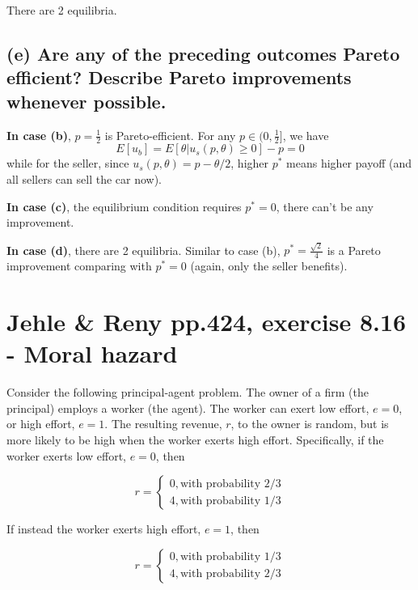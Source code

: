 \documentclass{article}
\begin{document}
There are 2 equilibria.

\subsection*{(e) Are any of the preceding outcomes Pareto efficient? Describe Pareto improvements whenever
possible.}

\textbf{In case (b)}, $p=\tfrac12$ is Pareto-efficient. For any $p \in (0, \tfrac12]$, we have $$E[u_b] = E[\theta|u_s(p, \theta) \ge 0 ] - p= 0$$
while for the seller, since $u_s(p, \theta) = p - \theta/2$, higher $p^*$ means higher payoff (and all sellers can sell the car now).

\textbf{In case (c)}, the equilibrium condition requires $p^*=0$, there can't be any improvement.

\textbf{In case (d)}, there are 2 equilibria. Similar to case (b), $p^*=\frac{\sqrt{2}}{4}$ is a Pareto improvement comparing
with $p^*=0$ (again, only the seller benefits).


\bigskip

\section{Jehle \& Reny pp.424, exercise 8.16 - Moral hazard}

Consider the following principal-agent problem. The owner of a firm (the principal) employs a
worker (the agent). The worker can exert low effort, $e = 0$, or high effort, $e = 1$. The resulting
revenue, $r$, to the owner is random, but is more likely to be high when the worker exerts high effort.
Specifically, if the worker exerts low effort, $e = 0$, then


\begin{equation}
r =
    \begin{cases}
0, \text{with probability 2/3} \\
4, \text{with probability 1/3}
    \end{cases}
\nonumber
\end{equation}
	

If instead the worker exerts high effort, $e = 1$, then

\begin{equation}
r =
    \begin{cases}
0, \text{with probability 1/3} \\
4, \text{with probability 2/3}
    \end{cases}
\nonumber
\end{equation}
\end{document}
